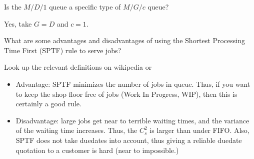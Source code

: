 \begin{exercise}
  Is the $M/D/1$ queue a specific type of  $M/G/c$ queue? 
  \begin{solution}
    Yes, take $G=D$ and $c=1$. 
  \end{solution}
\end{exercise}

\begin{exercise}
  What are some advantages and disadvantages of using the Shortest
  Processing Time First (SPTF) rule to serve jobs? 
  \begin{hint}
Look up the relevant
  definitions on wikipedia or
  \citet{hall91:_queuein_method_servic_manuf}
  \end{hint}
  \begin{solution}
  \begin{itemize}
  \item Advantage: SPTF minimizes the number of jobs in queue. Thus,
    if you want to keep the shop floor free of jobs (Work In Progress,
    WIP), then this is certainly a good rule. 
  \item Disadvantage: large jobs get near to terrible waiting times,
    and the variance of the waiting time increases. Thus, the $C_s^2$
    is larger than under FIFO. Also, SPTF does not take duedates into
    account, thus giving a reliable duedate quotation to a customer is
    hard (near to impossible.)
  \end{itemize}
  \end{solution}
\end{exercise}




\clearpage

